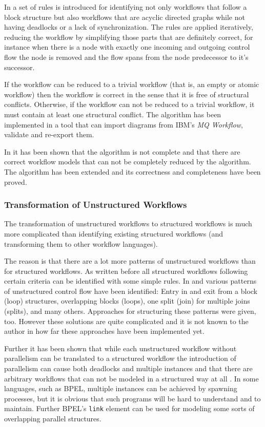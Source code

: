 In \cite{graRedIdStrConfl,analProcGraRedTech} a set of rules is introduced for identifying not only workflows that follow a block structure but also workflows that are acyclic directed graphs while not having deadlocks or a lack of synchronization. The rules are applied iteratively, reducing the workflow by simplifying those parts that are definitely correct, for instance when there is a node with exactly one incoming and outgoing control flow the node is removed and the flow spans from the node predecessor to it's successor.

If the workflow can be reduced to a trivial workflow (that is, an empty or atomic workflow) then the workflow is correct in the sense that it is free of structural conflicts. Otherwise, if the workflow can not be reduced to a trivial workflow, it must contain at least one structural conflict. The algorithm has been implemented in a tool that can import diagrams from IBM's \emph{MQ Workflow}, validate and re-export them.

In \cite{novelGraphReduction} it has been shown that the algorithm is not complete and that there are correct workflow models that can not be completely reduced by the algorithm. The algorithm has been extended and its correctness and completeness have been proved.

\subsubsection*{Transformation of Unstructured Workflows}

The transformation of unstructured workflows to structured workflows is much more complicated than identifying existing structured workflows (and transforming them to other workflow languages).

The reason is that there are a lot more patterns of unstructured workflows than for structured workflows. As written before all structured workflows following certain criteria can be identified with some simple rules. In \cite{strucWFmodeling} and \cite{taxo_unstr_wf} various patterns of unstructured control flow have been identified: Entry in and exit from a block (loop) structures, overlapping blocks (loops), one split (join) for multiple joins (splits), and many others. Approaches for structuring these patterns were given, too. However these solutions are quite complicated and it is not known to the author in how far these approaches have been implemented yet.

Further it has been shown that while each unstructured workflow without parallelism can be translated to a structured workflow the introduction of parallelism can cause both deadlocks and multiple instances and that there are arbitrary workflows that can not be modeled in a structured way at all \cite[Theorem 2]{strucWFmodeling}. In some languages, such as BPEL, multiple instances can be achieved by spawning processes, but it is obvious that such programs will be hard to understand and to maintain. Further BPEL's \verb|link| element can be used for modeling some sorts of overlapping parallel structures.

